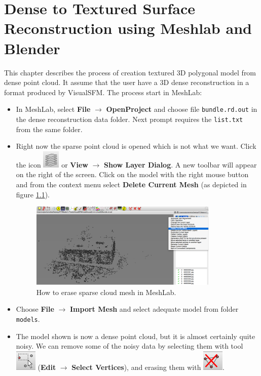 \chapter{Dense to Textured Surface Reconstruction using Meshlab and Blender}
\label{app:surface-reconstruction}
This chapter describes the process of creation textured 3D polygonal model from dense point cloud. It assume that the user have a 3D dense reconstruction in a format produced by VisualSFM. The process start in MeshLab:
\begin{itemize}
	\item[1.] In MeshLab, select \textbf{File} $\rightarrow$ \textbf{OpenProject} and choose file \texttt{bundle.rd.out} in the dense reconstruction data folder. Next prompt requires the \texttt{list.txt} from the same folder. 
	\item[2.] Right now the sparse point cloud is opened which is not what we want. Click the icon \includegraphics[keepaspectratio,width=.5cm]{fig/meshlab-layers.png} or \textbf{View} $\rightarrow$ \textbf{Show Layer Dialog}. A new toolbar will appear on the right of the screen. Click on the model with the right mouse button and from the context menu select \textbf{Delete Current Mesh} (as depicted in figure \ref{fig:meshlab-1}).
\begin{figure}[h]
	\begin{center}
		\includegraphics[keepaspectratio,width=9cm]{fig/meshlab-1.pdf}
	\end{center}
	\caption{How to erase sparse cloud mesh in MeshLab.}
	\label{fig:meshlab-1}
\end{figure}
	\item[3.] Choose \textbf{File} $\rightarrow$ \textbf{Import Mesh} and select adequate model from folder \texttt{models}.
	\item[4.] The model shown is now a dense point cloud, but it is almost certainly quite noisy. We can remove some of the noisy data by selecting them with tool \includegraphics[keepaspectratio,width=.5cm]{fig/meshlab-select.png} (\textbf{Edit} $\rightarrow$ \textbf{Select Vertices}), and erasing them with \includegraphics[keepaspectratio,width=.5cm]{fig/meshlab-delete.png}.


\end{itemize}
